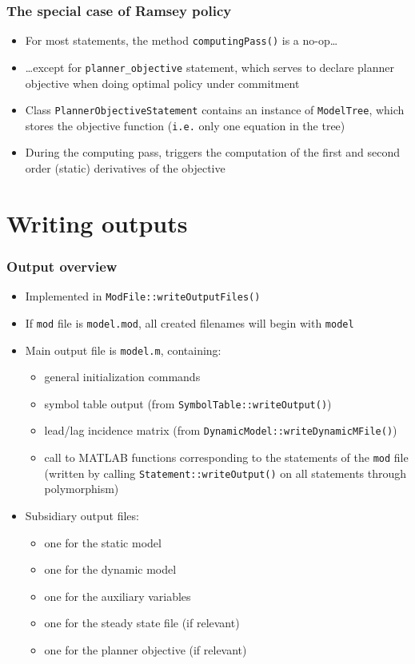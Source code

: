 \documentclass{beamer}
\begin{document}
\begin{frame}
  \frametitle{The special case of Ramsey policy}
  \begin{itemize}
  \item For most statements, the method \texttt{computingPass()} is a no-op\ldots
  \item \ldots except for \texttt{planner\_objective} statement, which serves to declare planner objective when doing optimal policy under commitment
  \item Class \texttt{PlannerObjectiveStatement} contains an instance of \texttt{ModelTree}, which stores the objective function (\texttt{i.e.} only one equation in the tree)
  \item During the computing pass, triggers the computation of the first and second order (static) derivatives of the objective
  \end{itemize}
\end{frame}

\section{Writing outputs}

\begin{frame}
  \frametitle{Output overview}
  \begin{itemize}
  \item Implemented in \texttt{ModFile::writeOutputFiles()}
  \item If \texttt{mod} file is \texttt{model.mod}, all created filenames will begin with \texttt{model}
  \item Main output file is \texttt{model.m}, containing:
    \begin{itemize}
    \item general initialization commands
    \item symbol table output (from \texttt{SymbolTable::writeOutput()})
    \item lead/lag incidence matrix (from \texttt{DynamicModel::writeDynamicMFile()})
    \item call to MATLAB functions corresponding to the statements of the \texttt{mod} file (written by calling \texttt{Statement::writeOutput()} on all statements through polymorphism)
    \end{itemize}
  \item Subsidiary output files:
    \begin{itemize}
    \item one for the static model
    \item one for the dynamic model
    \item one for the auxiliary variables
    \item one for the steady state file (if relevant)
    \item one for the planner objective (if relevant)
    \end{itemize}
  \end{itemize}
\end{frame}
\end{document}
